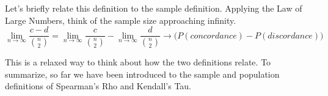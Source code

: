 Let's briefly relate this definition to the sample definition. Applying the Law of Large Numbers, think of the sample size approaching infinity. $$\lim_{n\to\infty}\frac{c-d}{{n \choose 2}}=\lim_{n\to\infty}\frac{c}{{n \choose 2}}-\lim_{n\to\infty}\frac{d}{{n \choose 2}}\longrightarrow \bigg(P\left(concordance\right)-P\left(discordance\right)\bigg)$$

This is a relaxed way to think about how the two definitions relate. To summarize, so far we have been introduced to the sample and population definitions of Spearman's Rho and Kendall's Tau.

